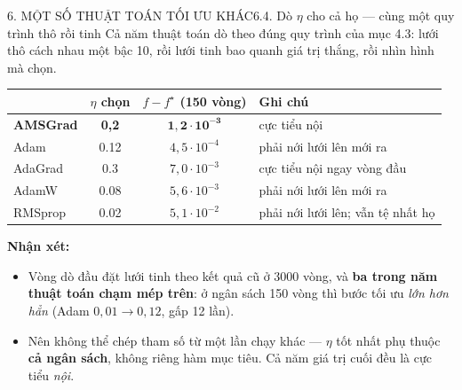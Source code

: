 \documentclass[aspectratio=169,11pt]{beamer}
\newcommand{\nx}{\textbf{Nhận xét:}}
\begin{document}
\begin{frame}{6. MỘT SỐ THUẬT TOÁN TỐI ƯU KHÁC}{6.4. Dò $\eta$ cho cả họ --- cùng một quy trình thô rồi tinh}
  \small
  Cả năm thuật toán dò theo đúng quy trình của mục 4.3: lưới thô cách nhau một bậc 10, rồi lưới
  tinh bao quanh giá trị thắng, rồi nhìn hình mà chọn.
  \begin{center}\small
  \begin{tabular}{lccl}
    \toprule
    & $\eta$ chọn & $f-f^\star$ (150 vòng) & Ghi chú\\
    \midrule
    \textbf{AMSGrad} & \textbf{0{,}2}  & $\mathbf{1{,}2\!\cdot\!10^{-3}}$ & cực tiểu nội\\
    Adam    & \num{0.12} & $4{,}5\!\cdot\!10^{-4}$ & phải nới lưới lên mới ra\\
    AdaGrad & \num{0.3}  & $7{,}0\!\cdot\!10^{-3}$ & cực tiểu nội ngay vòng đầu\\
    AdamW   & \num{0.08} & $5{,}6\!\cdot\!10^{-3}$ & phải nới lưới lên mới ra\\
    RMSprop & \num{0.02} & $5{,}1\!\cdot\!10^{-2}$ & phải nới lưới lên; vẫn tệ nhất họ\\
    \bottomrule
  \end{tabular}
  \end{center}
  \vspace{4pt}
  {\footnotesize\nx{}}
  \begin{itemize}\footnotesize
    \item Vòng dò đầu đặt lưới tinh theo kết quả cũ ở \num{3000} vòng, và \textbf{ba trong năm thuật
          toán chạm mép trên}: ở ngân sách 150 vòng thì bước tối ưu \emph{lớn hơn hẳn}
          (Adam $0{,}01\to0{,}12$, gấp 12 lần).
    \item Nên không thể chép tham số từ một lần chạy khác --- $\eta$ tốt nhất phụ thuộc \textbf{cả
          ngân sách}, không riêng hàm mục tiêu. Cả năm giá trị cuối đều là cực tiểu \emph{nội}.
  \end{itemize}
\end{frame}
\end{document}
